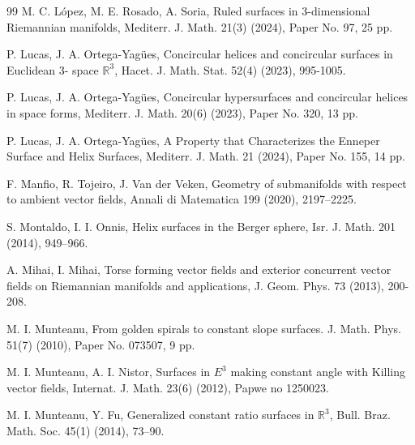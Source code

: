 \documentclass[12pt,reqno]{amsart}
\def\r{\mathbb R}
\theoremstyle{definition}
\begin{document}
\begin{thebibliography}{99}
 M. C. L\'opez, M. E. Rosado, A. Soria, Ruled surfaces in 3-dimensional Riemannian manifolds, Mediterr. J. Math. 21(3) (2024), Paper No. 97, 25 pp.


 P. Lucas, J. A. Ortega-Yag\"ues, Concircular helices and concircular surfaces in Euclidean 3-
space $\r^3$, Hacet. J. Math. Stat. 52(4) (2023), 995-1005.

 P. Lucas, J. A. Ortega-Yag\"ues, Concircular hypersurfaces and concircular helices in space forms, Mediterr. J. Math. 20(6) (2023), Paper No. 320, 13 pp.

 P. Lucas, J. A. Ortega-Yag\"ues, A Property that Characterizes the Enneper Surface and Helix Surfaces, Mediterr. J. Math. 21 (2024), Paper No. 155, 14 pp.



 F. Manfio, R. Tojeiro, J. Van der Veken, Geometry of submanifolds with respect to ambient vector fields, Annali di Matematica 199 (2020), 2197–2225.

 S. Montaldo, I. I. Onnis, Helix surfaces in the Berger sphere, Isr. J. Math. 201 (2014), 949–966.

 A. Mihai, I. Mihai, Torse forming vector fields and exterior concurrent vector fields on Riemannian manifolds and applications, J. Geom. Phys. 73 (2013), 200-208.

 M. I. Munteanu, From golden spirals to constant slope surfaces. J. Math. Phys. 51(7) (2010), Paper No. 073507, 9 pp.

 M. I. Munteanu, A. I. Nistor, Surfaces in $E^3$ making constant angle with Killing vector fields, Internat. J. Math. 23(6) (2012),  Papwe no 1250023.

 M. I. Munteanu, Y. Fu, Generalized constant ratio surfaces in $\r^3$, Bull. Braz. Math. Soc. 45(1) (2014), 73–90.


\end{thebibliography}
\end{document}
